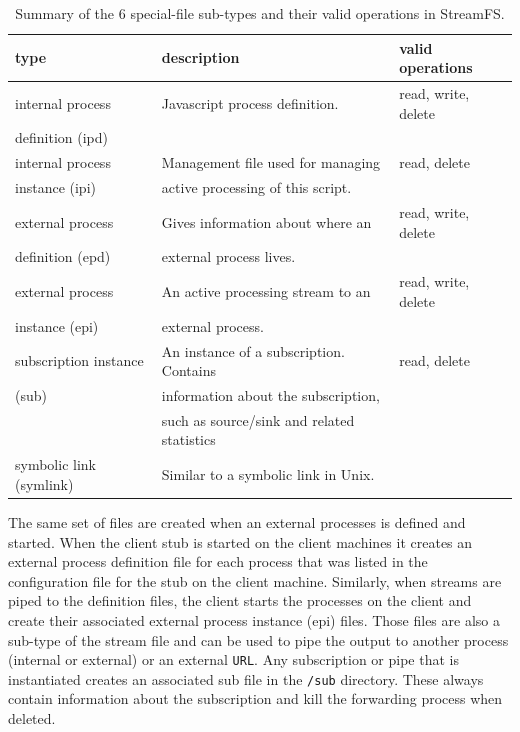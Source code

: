 \begin{table}[h]
\begin{center}
\begin{tabular}{| l | l | l |}
	\hline
	\textbf{type} & \textbf{description} & \textbf{valid operations} \\ \hline
	
	internal process  & Javascript process definition.  & read, write, delete  \\ 
	definition (ipd)   & 							    &	\\ \hline

	internal process  & Management file used for managing & read, delete \\
	instance (ipi)	  & active processing of this script. & \\ \hline

	external process  & Gives information about where an & read, write, delete \\
	definition (epd)  & external process lives. &\\ \hline

	external process  & An active processing stream to an  & read, write, delete \\
	instance (epi)	  & external process. &\\ \hline

	subscription instance & An instance of a subscription.  Contains & read, delete \\
				(sub) 	  & information about the subscription, &\\
								& such as source/sink and related statistics &\\ \hline
								
	symbolic link (symlink) & Similar to a symbolic link in Unix. & \\
	\hline
\end{tabular}
\caption{Summary of the 6 special-file sub-types and their valid operations in StreamFS.}
\label{tab:filesubtypes}
\end{center}
\end{table}

The same set of files are created when an external processes is defined and started.  When the client stub is started on the client
machines it creates an external process definition file for each process that was listed in the configuration file for the stub on 
the client machine.  Similarly, when streams are piped to the definition files, the client starts the processes on the client
and create their associated external process instance (epi) files.  Those files are also a sub-type of the stream file and can
be used to pipe the output to another process (internal or external) or an external \texttt{URL}.
Any subscription or pipe that is instantiated creates an associated sub file in the \texttt{/sub} directory.  These always contain information
about the subscription and kill the forwarding process when deleted.

